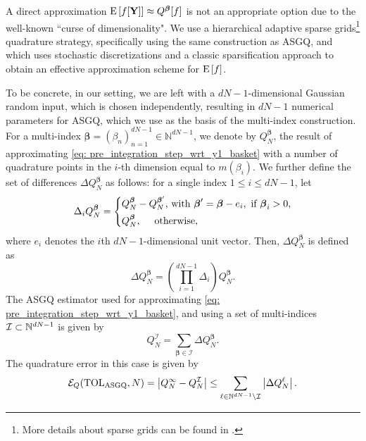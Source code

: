 A direct approximation $\mathrm{E}\left[f[\mathbf{Y}]\right] \approx Q^{\boldsymbol{\beta}}[f]$ is not an appropriate option  due to the well-known ``curse of dimensionality". We use  a hierarchical adaptive sparse grids\footnote{More details about sparse grids can be found in \cite{bungartz2004sparse}.} quadrature strategy, specifically using the same
construction as ASGQ, and which uses  stochastic discretizations  and a classic sparsification approach to obtain an effective approximation scheme for $\mathrm{E}\left[f\right]$. 

To be concrete, in our setting, we are left with a $dN-1$-dimensional Gaussian random input, which is chosen independently, resulting in  $dN-1$ numerical parameters for ASGQ, which we use as the basis of the multi-index construction. For a multi-index $\boldsymbol{\beta} = (\beta_n)_{n=1}^{dN-1} \in \mathbb{N}^{dN-1}$, we denote  by
$Q_N^{\boldsymbol{\beta}}$,   the result of approximating \eqref{eq: pre_integration_step_wrt_y1_basket} with a number of quadrature points  in the $i$-th dimension equal to  $m(\beta_i)$. We further define the set of
differences $\Delta Q_N^{\boldsymbol{\beta}}$ as follows: for a single index $1 \le i \le dN-1$,
let
\begin{equation*}
\Delta_i Q_N^{\boldsymbol{\beta}} = \left\{ 
\aligned 
 Q_N^{\boldsymbol{\beta}} &- Q_N^{\boldsymbol{\beta}'}  \text{, with } \boldsymbol{\beta}' =\boldsymbol{\beta} - e_i, \text{ if } \boldsymbol{\beta}_i>0 \COMMA \\
 Q_N^{\boldsymbol{\beta}} &, \quad  \text{ otherwise,}
\endaligned
\right.
\end{equation*}
where $e_i$ denotes the $i$th $dN-1$-dimensional unit vector. Then, $\Delta
Q_N^{\boldsymbol{\beta}}$ is defined as
\begin{equation*}
\Delta Q_N^{\boldsymbol{\beta}} = \left( \prod_{i=1}^{dN-1} \Delta_i \right) Q_N^{\boldsymbol{\beta}}.
\end{equation*}
The ASGQ estimator used for approximating \eqref{eq: pre_integration_step_wrt_y1_basket}, and using a set of multi-indices $\mathcal{I}\subset \mathbb{N}^{dN-1}$ is given by
\begin{equation}\label{eq:MISC_quad_estimator}
	Q_N^{\mathcal{I}} = \sum_{\boldsymbol{\beta} \in \mathcal{I}} \Delta Q_N^{\boldsymbol{\beta}}.
\end{equation}
The quadrature error in this  case  is given by
\begin{equation}\label{eq:quadrature error}
\mathcal{E}_Q(\text{TOL}_{\text{ASGQ}},N) =\left\lvert Q_N^\infty - Q_N^\mathcal{I}\right\rvert \le \sum_{\ell \in \mathbb{N}^{dN-1} \setminus
	\mathcal{I}} \left\lvert\Delta Q_N^\ell\right\rvert.
\end{equation}
